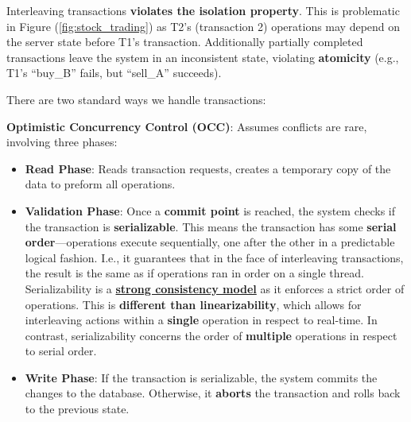 \noindent
Interleaving transactions \textbf{violates the isolation property}. This is problematic in 
Figure (\ref{fig:stock_trading}) as T2's (transaction 2) operations may depend on the server 
state before T1's transaction. Additionally partially completed transactions leave the system in an inconsistent state, violating
\textbf{atomicity}
(e.g., T1's ``buy\_B'' fails, but ``sell\_A'' succeeds).

\newpage

\noindent
There are two standard ways we handle transactions:
\begin{Def}

    \textbf{Optimistic Concurrency Control (OCC)}: Assumes conflicts are rare, involving three phases:
        \begin{itemize}
            \item \textbf{Read Phase}: Reads transaction requests, creates a temporary copy of the data to preform all operations.
            \item \textbf{Validation Phase}: Once a \textbf{commit point} is reached, the system checks if the 
            transaction is \textbf{serializable}. This means the transaction has some \textbf{serial order}---operations execute sequentially, one after the other in a predictable logical fashion.
            I.e., it guarantees that in the face of interleaving transactions, the result is the same as if operations ran in order on a single thread.\\

            Serializability is a \underline{\textbf{strong consistency model}} as it enforces a strict order of operations.
            This is \textbf{different than linearizability}, which allows for interleaving actions within a \textbf{single} operation in respect to real-time.
            In contrast, serializability concerns the order of \textbf{multiple} operations in respect to serial order.
            \item \textbf{Write Phase}: If the transaction is serializable, the system commits the changes to the database. Otherwise, it \textbf{aborts} the transaction and rolls back to the previous state.
        \end{itemize}

    
\end{Def}
